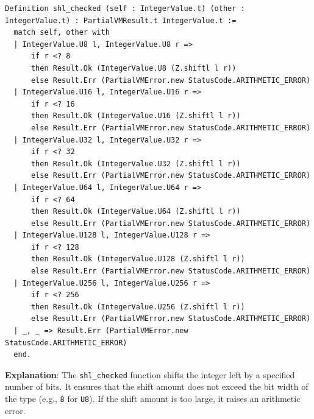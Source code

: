 \documentclass[english, 12pt, a4paper, biz, utf8, a-2b, online]{aaltothesis}
\begin{document}
\begin{tcolorbox}[
  colback=white,     %
  colframe=white,    %
  boxrule=0pt,       %
  sharp corners,     %
  boxsep=0pt,        %
  left=0pt,          %
  right=0pt,         %
  top=0pt,           %
  bottom=0pt         %
]
\begin{lstlisting}[caption={Checked Left Shift \texttt{shl\_checked}},captionpos=b]
Definition shl_checked (self : IntegerValue.t) (other : IntegerValue.t) : PartialVMResult.t IntegerValue.t :=
  match self, other with
  | IntegerValue.U8 l, IntegerValue.U8 r =>
      if r <? 8
      then Result.Ok (IntegerValue.U8 (Z.shiftl l r))
      else Result.Err (PartialVMError.new StatusCode.ARITHMETIC_ERROR)
  | IntegerValue.U16 l, IntegerValue.U16 r =>
      if r <? 16
      then Result.Ok (IntegerValue.U16 (Z.shiftl l r))
      else Result.Err (PartialVMError.new StatusCode.ARITHMETIC_ERROR)
  | IntegerValue.U32 l, IntegerValue.U32 r =>
      if r <? 32
      then Result.Ok (IntegerValue.U32 (Z.shiftl l r))
      else Result.Err (PartialVMError.new StatusCode.ARITHMETIC_ERROR)
  | IntegerValue.U64 l, IntegerValue.U64 r =>
      if r <? 64
      then Result.Ok (IntegerValue.U64 (Z.shiftl l r))
      else Result.Err (PartialVMError.new StatusCode.ARITHMETIC_ERROR)
  | IntegerValue.U128 l, IntegerValue.U128 r =>
      if r <? 128
      then Result.Ok (IntegerValue.U128 (Z.shiftl l r))
      else Result.Err (PartialVMError.new StatusCode.ARITHMETIC_ERROR)
  | IntegerValue.U256 l, IntegerValue.U256 r =>
      if r <? 256
      then Result.Ok (IntegerValue.U256 (Z.shiftl l r))
      else Result.Err (PartialVMError.new StatusCode.ARITHMETIC_ERROR)
  | _, _ => Result.Err (PartialVMError.new StatusCode.ARITHMETIC_ERROR)
  end.
\end{lstlisting}
\end{tcolorbox}

\textbf{Explanation}: The \texttt{shl\_checked} function shifts the integer left by a specified number of bits. It ensures that the shift amount does not exceed the bit width of the type (e.g., \texttt{8} for \texttt{U8}). If the shift amount is too large, it raises an arithmetic error.
\end{document}

